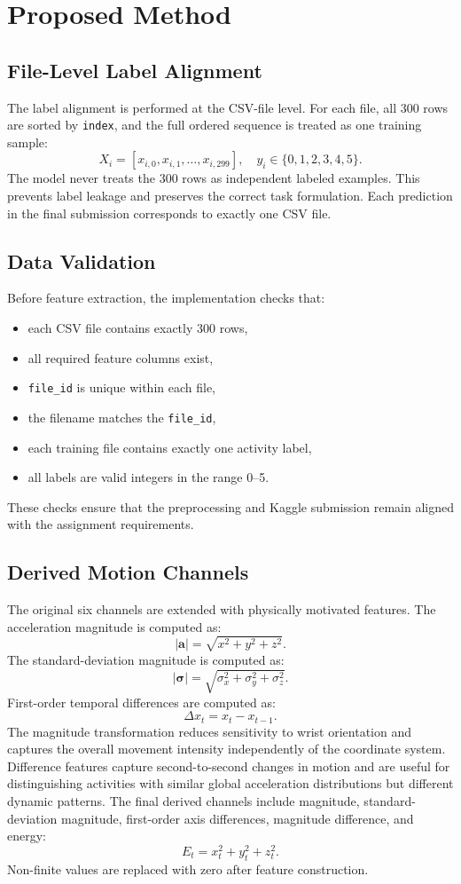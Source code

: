\documentclass[conference]{IEEEtran}
\begin{document}
\section{Proposed Method}
\subsection{File-Level Label Alignment}
The label alignment is performed at the CSV-file level. For each file, all 300 rows are sorted by \texttt{index}, and the full ordered sequence is treated as one training sample:
\[
X_i = [x_{i,0}, x_{i,1}, \ldots, x_{i,299}], \quad y_i \in \{0,1,2,3,4,5\}.
\]
The model never treats the 300 rows as independent labeled examples. This prevents label leakage and preserves the correct task formulation. Each prediction in the final submission corresponds to exactly one CSV file.
\subsection{Data Validation}
Before feature extraction, the implementation checks that:
\begin{itemize}[noitemsep]
    \item each CSV file contains exactly 300 rows,
    \item all required feature columns exist,
    \item \texttt{file\_id} is unique within each file,
    \item the filename matches the \texttt{file\_id},
    \item each training file contains exactly one activity label,
    \item all labels are valid integers in the range 0--5.
\end{itemize}
These checks ensure that the preprocessing and Kaggle submission remain aligned with the assignment requirements.
\subsection{Derived Motion Channels}
The original six channels are extended with physically motivated features. The acceleration magnitude is computed as:
\[
|\mathbf{a}| = \sqrt{x^2+y^2+z^2}.
\]
The standard-deviation magnitude is computed as:
\[
|\boldsymbol{\sigma}| = \sqrt{\sigma_x^2+\sigma_y^2+\sigma_z^2}.
\]
First-order temporal differences are computed as:
\[
\Delta x_t = x_t - x_{t-1}.
\]
The magnitude transformation reduces sensitivity to wrist orientation and captures the overall movement intensity independently of the coordinate system. Difference features capture second-to-second changes in motion and are useful for distinguishing activities with similar global acceleration distributions but different dynamic patterns.
The final derived channels include magnitude, standard-deviation magnitude, first-order axis differences, magnitude difference, and energy:
\[
E_t = x_t^2 + y_t^2 + z_t^2.
\]
Non-finite values are replaced with zero after feature construction.
\end{document}
